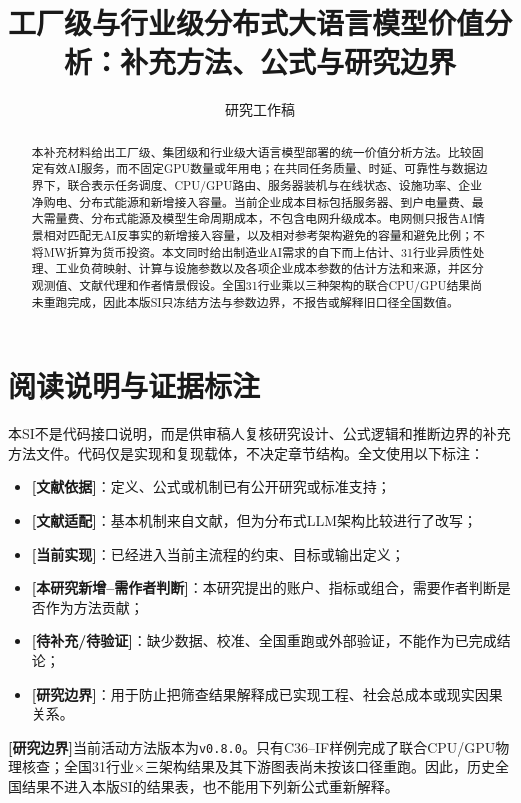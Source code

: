 \documentclass[preprint]{elsarticle}
\newcommand{\implemented}{\textcolor{green!40!black}{\textbf{[当前实现]}}}
\newcommand{\literature}{\textcolor{blue!70!black}{\textbf{[文献依据]}}}
\newcommand{\adapted}{\textcolor{violet!75!black}{\textbf{[文献适配]}}}
\newcommand{\newwork}{\textcolor{orange!80!black}{\textbf{[本研究新增--需作者判断]}}}
\newcommand{\pending}{\textcolor{red!70!black}{\textbf{[待补充/待验证]}}}
\newcommand{\boundary}{\textcolor{black!65}{\textbf{[研究边界]}}}
\begin{document}
\begin{frontmatter}

\title{工厂级与行业级分布式大语言模型价值分析：补充方法、公式与研究边界}

\author{研究工作稿}

\begin{abstract}
本补充材料给出工厂级、集团级和行业级大语言模型部署的统一价值分析方法。比较固定有效AI服务，而不固定GPU数量或年用电；在共同任务质量、时延、可靠性与数据边界下，联合表示任务调度、CPU/GPU路由、服务器装机与在线状态、设施功率、企业净购电、分布式能源和新增接入容量。当前企业成本目标包括服务器、到户电量费、最大需量费、分布式能源及模型生命周期成本，不包含电网升级成本。电网侧只报告AI情景相对匹配无AI反事实的新增接入容量，以及相对参考架构避免的容量和避免比例；不将MW折算为货币投资。本文同时给出制造业AI需求的自下而上估计、31行业异质性处理、工业负荷映射、计算与设施参数以及各项企业成本参数的估计方法和来源，并区分观测值、文献代理和作者情景假设。全国31行业乘以三种架构的联合CPU/GPU结果尚未重跑完成，因此本版SI只冻结方法与参数边界，不报告或解释旧口径全国数值。
\end{abstract}

\end{frontmatter}

\tableofcontents
\clearpage

\section{阅读说明与证据标注}

本SI不是代码接口说明，而是供审稿人复核研究设计、公式逻辑和推断边界的补充方法文件。代码仅是实现和复现载体，不决定章节结构。全文使用以下标注：

\begin{itemize}
  \item \literature：定义、公式或机制已有公开研究或标准支持；
  \item \adapted：基本机制来自文献，但为分布式LLM架构比较进行了改写；
  \item \implemented：已经进入当前主流程的约束、目标或输出定义；
  \item \newwork：本研究提出的账户、指标或组合，需要作者判断是否作为方法贡献；
  \item \pending：缺少数据、校准、全国重跑或外部验证，不能作为已完成结论；
  \item \boundary：用于防止把筛查结果解释成已实现工程、社会总成本或现实因果关系。
\end{itemize}

\boundary 当前活动方法版本为\texttt{v0.8.0}。只有C36--IF样例完成了联合CPU/GPU物理核查；全国31行业$\times$三架构结果及其下游图表尚未按该口径重跑。因此，历史全国结果不进入本版SI的结果表，也不能用下列新公式重新解释。
\end{document}
